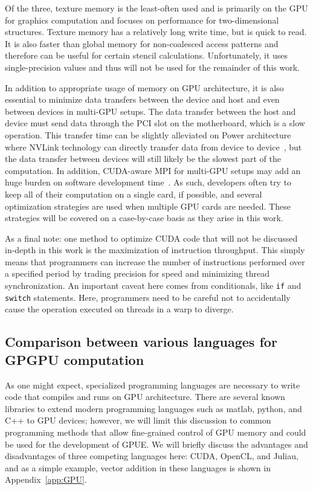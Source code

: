 Of the three, texture memory is the least-often used and is primarily on the GPU for graphics computation and focuses on performance for two-dimensional structures.
Texture memory has a relatively long write time, but is quick to read.
It is also faster than global memory for non-coalesced access patterns and therefore can be useful for certain stencil calculations.
Unfortunately, it uses single-precision values and thus will not be used for the remainder of this work.

In addition to appropriate usage of memory on GPU architecture, it is also essential to minimize data transfers between the device and host and even between devices in multi-GPU setups.
The data transfer between the host and device must send data through the PCI slot on the motherboard, which is a slow operation.
This transfer time can be slightly alleviated on Power architecture where NVLink technology can directly transfer data from device to device~\cite{foley2017}, but the data transfer between devices will still likely be the slowest part of the computation.
In addition, CUDA-aware MPI for multi-GPU setups may add an huge burden on software development time~\cite{lonvcar2016, wang2013}.
As such, developers often try to keep all of their computation on a single card, if possible, and several optimization strategies are used when multiple GPU cards are needed.
These strategies will be covered on a case-by-case basis as they arise in this work.

As a final note: one method to optimize CUDA code that will not be discussed in-depth in this work is the maximization of instruction throughput.
This simply means that programmers can increase the number of instructions performed over a specified period by trading precision for speed and minimizing thread synchronization.
An important caveat here comes from conditionals, like \texttt{if} and \texttt{switch} statements.
Here, programmers need to be careful not to accidentally cause the operation executed on threads in a warp to diverge.

\subsection{Comparison between various languages for GPGPU computation}

As one might expect, specialized programming languages are necessary to write code that compiles and runs on GPU architecture.
There are several known libraries to extend modern programming languages such as matlab, python, and C++ to GPU devices; however, we will limit this discussion to common programming methods that allow fine-grained control of GPU memory and could be used for the development of GPUE.
We will briefly discuss the advantages and disadvantages of three competing languages here: CUDA, OpenCL, and Juliau, and as a simple example, vector addition in these languages is shown in  Appendix~\ref{app:GPU}.

